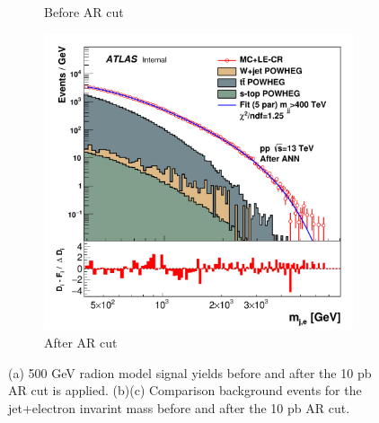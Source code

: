 \begin{figure}[H]
\begin{subfigure}[h]{0.28\linewidth}
    \caption{Before AR cut}
    \end{subfigure}
    \hfill
    \begin{subfigure}[h]{0.28\linewidth}
    \includegraphics[scale=0.25]{figs/ch6/ar/mass_je_mcCR_after_scale.pdf}%
    \caption{After AR cut}
    \end{subfigure}
    \hfill
    \caption{(a) 500 GeV radion model signal yields before and after the 10 pb AR cut is applied. (b)(c) Comparison background events for the jet+electron invarint mass before and after the 10 pb AR cut. }
\label{fig:sb-yields}
\end{figure}

